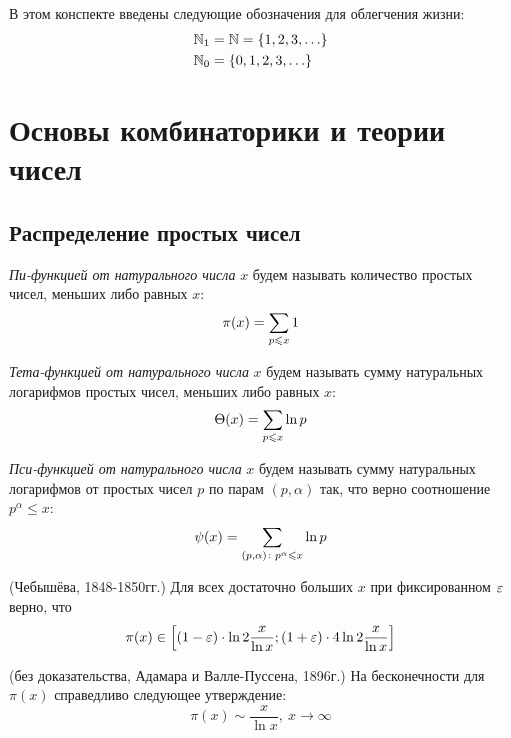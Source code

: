 \begin{anote}
	В этом конспекте введены следующие обозначения для облегчения жизни:
	\begin{align*}
		&{\mathbb{N}_1 = \mathbb{N} = \{1, 2, 3, \ldots\}}
		\\
		&{\mathbb{N}_0 = \{0, 1, 2, 3, \ldots\}}
	\end{align*}
\end{anote}

\section{Основы комбинаторики и теории чисел}
\subsection{Распределение простых чисел}

\begin{definition}
	\textit{Пи-функцией от натурального числа } $x$ будем называть количество простых чисел, меньших либо равных $x$:
	\[
		\pi(x) = \sum\limits_{p \leqslant x} 1
	\]
\end{definition}

\begin{definition}
	\textit{Тета-функцией от натурального числа} $x$ будем называть сумму натуральных логарифмов простых чисел, меньших либо равных $x$:
	\[
		\Theta(x) = \sum\limits_{p \leqslant x} \ln p
	\]
\end{definition}

\begin{definition}
	\textit{Пси-функцией от натурального числа} $x$ будем называть сумму натуральных логарифмов от простых чисел $p$ по парам $(p, \alpha)$ так, что верно соотношение $p^\alpha \le x$:
	\[
		\psi(x) = \sum\limits_{(p, \alpha) \colon p^\alpha \leqslant x} \ln p
	\]
\end{definition}

\begin{theorem} (Чебышёва, 1848-1850гг.)
	Для всех достаточно больших $x$ при фиксированном $\varepsilon$ верно, что
	\[
		\pi(x) \in \left[(1 - \varepsilon) \cdot \ln 2 \frac{x}{\ln x}; (1 + \varepsilon) \cdot 4\ln 2 \frac{x}{\ln x}\right]
	\]
\end{theorem}

\begin{theorem} (без доказательства, Адамара и Валле-Пуссена, 1896г.)
	На бесконечности для $\pi(x)$ справедливо следующее утверждение:
	\[
		\pi(x) \sim \frac{x}{\ln x},\ x \to \infty
	\]
\end{theorem}

